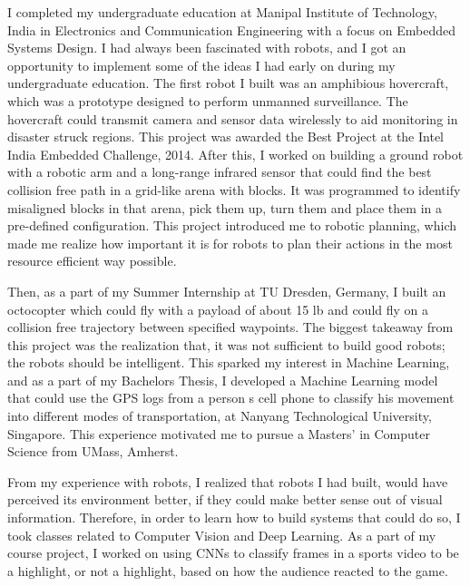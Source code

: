 \documentclass[10pt]{article}
\begin{document}
I completed my undergraduate education at Manipal Institute of Technology, India in Electronics and Communication Engineering with a focus on Embedded Systems Design. I had always been fascinated with robots, and I got an opportunity to implement some of the ideas I had early on during my undergraduate education. The first robot I built was an amphibious hovercraft, which was a prototype designed to perform unmanned surveillance. The hovercraft could transmit camera and sensor data wirelessly to aid monitoring in disaster struck regions. This project was awarded the Best Project at the Intel India Embedded Challenge, 2014. After this, I worked on building a ground robot with a robotic arm and a long-range infrared sensor that could find the best collision free path in a grid-like arena with blocks. It was programmed to identify misaligned blocks in that arena, pick them up, turn them and place them in a pre-defined configuration. This project introduced me to robotic planning, which made me realize how important it is for robots to plan their actions in the most resource efficient way possible.
\par
Then, as a part of my Summer Internship at TU Dresden, Germany, I built an octocopter which could fly with a payload of about 15 lb and could fly on a collision free trajectory between specified waypoints. The biggest takeaway from this project was the realization that, it was not sufficient to build good robots; the robots should be intelligent. This sparked my interest in Machine Learning, and as a part of my Bachelor\textquotesingle s Thesis, I developed a Machine Learning model that could use the GPS logs from a person \textquotesingle s cell phone to classify his movement into different modes of transportation, at Nanyang Technological University, Singapore. This experience  motivated me to pursue a Masters' in Computer Science from UMass, Amherst.
\par
 From my experience with robots, I realized that robots I had built, would have perceived its environment better, if they could make better sense out of visual information. Therefore, in order to learn how to build systems that could do so, I took classes related to Computer Vision and Deep Learning. As a part of my course project, I worked on using CNNs to classify frames in a sports video to be a highlight, or not a highlight, based on how the audience reacted to the game. 
\end{document}
